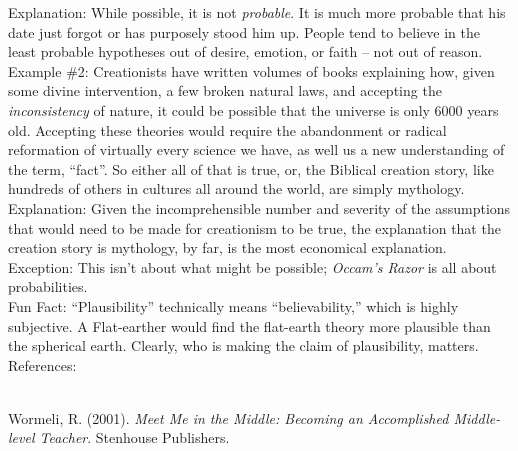 \documentclass[a4paper,12pt,single,pdftex]{scrbook}
\begin{document}
    
      Explanation: While possible, it is not {\it probable}.  It is much more probable that his date just forgot or has purposely stood him up.  People tend to believe in the least probable hypotheses out of desire, emotion, or faith -- not out of reason.
    \\

    
      Example \#2: Creationists have written volumes of books explaining how, given some divine intervention, a few broken natural laws, and accepting the {\it inconsistency} of nature, it could be possible that the universe is only 6000 years old.  Accepting these theories would require the abandonment or radical reformation of virtually every science we have, as well us a new understanding of the term, “fact”.  So either all of that is true, or, the Biblical creation story, like hundreds of others in cultures all around the world, are simply mythology.
    \\

    
      Explanation: Given the incomprehensible number and severity of the assumptions that would need to be made for creationism to be true, the explanation that the creation story is mythology, by far, is the most economical explanation.
    \\

    
      Exception: This isn't about what might be possible; {\it Occam’s Razor} is all about probabilities.
    \\

    
      Fun Fact: “Plausibility” technically means “believability,” which is highly subjective. A Flat-earther would find the flat-earth theory more plausible than the spherical earth. Clearly, who is making the claim of plausibility, matters. 
    \\

    References:

    
      
        
      \\

      
        
          Wormeli, R. (2001). {\it Meet Me in the Middle: Becoming an Accomplished Middle-level Teacher}. Stenhouse Publishers.
        
      
      
        
      \\

    
    
      
    \\
\end{document}
